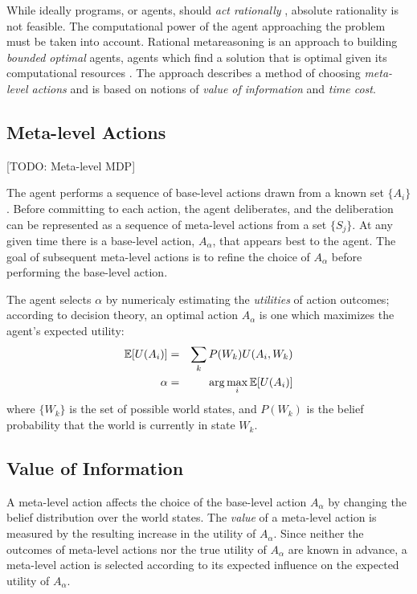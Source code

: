 While ideally programs, or agents, should {\em act rationally}
\cite{Russell.aima}, absolute rationality is not feasible. The
computational power of the agent approaching the problem must be taken
into account. Rational metareasoning \cite{Russell.right} is an
approach to building {\em bounded optimal} agents, agents which find a
solution that is optimal given its computational resources
\cite{Horvitz.reasoningabout}. The approach describes a method of
choosing {\em meta-level actions} and is based on notions of {\em
value of information} and {\em time cost}.

\subsection{Meta-level Actions}

[TODO: Meta-level MDP]

The agent performs a sequence of base-level actions drawn from a known
set $\{A_i\}$. Before committing to each action, the agent
deliberates, and the deliberation can be represented as a sequence of
meta-level actions from a set $\{S_j\}$. At any given time there is a
base-level action, $A_\alpha$, that appears best to the agent. The
goal of subsequent meta-level actions is to refine the choice of
$A_\alpha$ before performing the base-level action.

The agent selects $\alpha$ by numericaly estimating the {\em
  utilities} of action outcomes; according to decision theory, an
optimal action $A_\alpha$ is one which maximizes the agent's expected
utility:
\begin{eqnarray}
\label{eq:bg-limited-eu}
\mathbb{E}[U(A_i)]&=&\sum_k P(W_k) U(A_i,W_k)\\
\alpha&=&\arg \max_i \mathbb{E}[U(A_i)]
\end{eqnarray}
where $\{W_k\}$ is the set of possible world states, and $P(W_k)$ is
the belief probability that the world is currently in state $W_k$.

\subsection{Value of Information}
\label{sec:ratimeta-voi}

A meta-level action affects the choice of the base-level action
$A_\alpha$ by changing the belief distribution over the world
states. The {\em value} of a meta-level action is measured by the
resulting increase in the utility of $A_\alpha$. Since neither the
outcomes of meta-level actions nor the true utility of $A_\alpha$ are
known in advance, a meta-level action is selected according to its
expected influence on the expected utility of $A_\alpha$.


